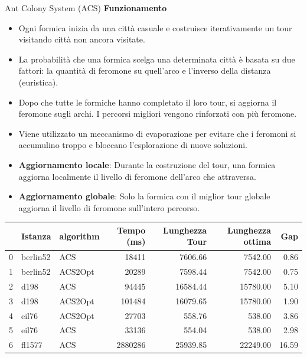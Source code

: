 \documentclass{beamer}
\begin{document}
\begin{frame}{Ant Colony System (ACS)}
    \textbf{Funzionamento}
    \begin{itemize}
        \item Ogni formica inizia da una città casuale e costruisce iterativamente un tour visitando città non ancora visitate.
        \item La probabilità che una formica scelga una determinata città è basata su due fattori: la quantità di feromone su quell’arco e l'inverso della distanza (euristica).
        \item Dopo che tutte le formiche hanno completato il loro tour, si aggiorna il feromone sugli archi. I percorsi migliori vengono rinforzati con più feromone.
        \item Viene utilizzato un meccanismo di evaporazione per evitare che i feromoni si accumulino troppo e bloccano l'esplorazione di nuove soluzioni.
        \item \textbf{Aggiornamento locale}: Durante la costruzione del tour, una formica aggiorna localmente il livello di feromone dell’arco che attraversa.
        \item \textbf{Aggiornamento globale}: Solo la formica con il miglior tour globale aggiorna il livello di feromone sull’intero percorso.
    \end{itemize}
    \begin{table}[H]
        \centering
        \begin{tabular}{lllrrrr}
            \toprule
               & Istanza  & algorithm & Tempo (ms) & Lunghezza Tour & Lunghezza ottima & Gap   \\
            \midrule
            0  & berlin52 & ACS       & 18411      & 7606.66        & 7542.00          & 0.86  \\
            1  & berlin52 & ACS2Opt   & 20289      & 7598.44        & 7542.00          & 0.75  \\
            2  & d198     & ACS       & 94445      & 16584.44       & 15780.00         & 5.10  \\
            3  & d198     & ACS2Opt   & 101484     & 16079.65       & 15780.00         & 1.90  \\
            4  & eil76    & ACS2Opt   & 27703      & 558.76         & 538.00           & 3.86  \\
            5  & eil76    & ACS       & 33136      & 554.04         & 538.00           & 2.98  \\
            6  & fl1577   & ACS       & 2880286    & 25939.85       & 22249.00         & 16.59 \\

\end{tabular}
\end{table}
\end{frame}
\end{document}
